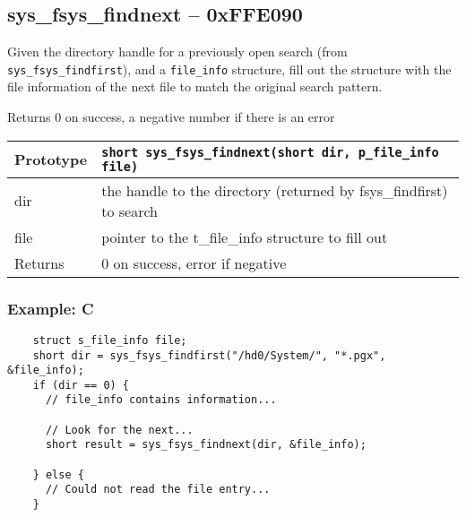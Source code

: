 \subsection*{sys\_fsys\_findnext -- 0xFFE090}
Given the directory handle for a previously open search (from \verb+sys_fsys_findfirst+), and a \verb+file_info+ structure, fill out the structure with the file information of the next file to match the original search pattern.

Returns 0 on success, a negative number if there is an error

\bigskip

\begin{tabular}{|l||l|} \hline
Prototype & \lstinline!short sys_fsys_findnext(short dir, p_file_info file)! \\ \hline
dir & the handle to the directory (returned by fsys\_findfirst) to search \\ \hline
file & pointer to the t\_file\_info structure to fill out \\ \hline
Returns & 0 on success, error if negative \\ \hline
\end{tabular}

\subsubsection*{Example: C}
\begin{lstlisting}
    struct s_file_info file;
    short dir = sys_fsys_findfirst("/hd0/System/", "*.pgx", &file_info);
    if (dir == 0) {
      // file_info contains information...

      // Look for the next...
      short result = sys_fsys_findnext(dir, &file_info);

    } else {
      // Could not read the file entry...
    }
\end{lstlisting}

